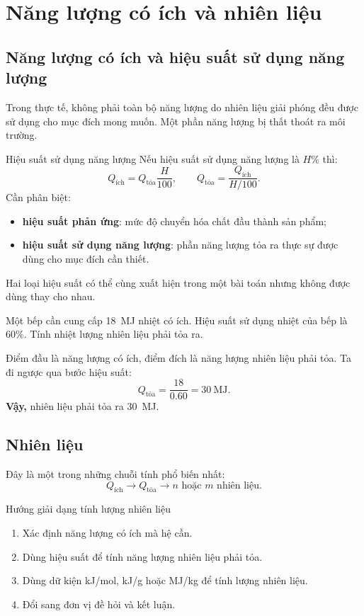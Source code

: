 \section{Năng lượng có ích và nhiên liệu}

\subsection{Năng lượng có ích và hiệu suất sử dụng năng lượng}

Trong thực tế, không phải toàn bộ năng lượng do nhiên liệu giải phóng đều được sử dụng cho mục đích mong muốn. Một phần năng lượng bị thất thoát ra môi trường.

\begin{ghinho}{Hiệu suất sử dụng năng lượng}
Nếu hiệu suất sử dụng năng lượng là $H\%$ thì:
\[
Q_{\text{ích}}=Q_{\text{tỏa}}\frac{H}{100},
\qquad
Q_{\text{tỏa}}=\frac{Q_{\text{ích}}}{H/100}.
\]
Cần phân biệt:
\begin{itemize}
\item \textbf{hiệu suất phản ứng}: mức độ chuyển hóa chất đầu thành sản phẩm;
\item \textbf{hiệu suất sử dụng năng lượng}: phần năng lượng tỏa ra thực sự được dùng cho mục đích cần thiết.
\end{itemize}
Hai loại hiệu suất có thể cùng xuất hiện trong một bài toán nhưng không được dùng thay cho nhau.
\end{ghinho}

\begin{vidu}
Một bếp cần cung cấp \SI{18}{\mega\joule} nhiệt có ích. Hiệu suất sử dụng nhiệt của bếp là $60\%$. Tính nhiệt lượng nhiên liệu phải tỏa ra.
\end{vidu}
\begin{loigiai}
Điểm đầu là năng lượng có ích, điểm đích là năng lượng nhiên liệu phải tỏa. Ta đi ngược qua bước hiệu suất:
\[
Q_{\text{tỏa}}=\frac{18}{0.60}=\SI{30}{\mega\joule}.
\]
\textbf{Vậy,} nhiên liệu phải tỏa ra \SI{30}{\mega\joule}.
\end{loigiai}

\subsection{Nhiên liệu}

Đây là một trong những chuỗi tính phổ biến nhất:
\[
\boxed{Q_{\text{ích}}}
\longrightarrow
\boxed{Q_{\text{tỏa}}}
\longrightarrow
\boxed{n\text{ hoặc }m\text{ nhiên liệu}}.
\]

\begin{ghinho}{Hướng giải dạng tính lượng nhiên liệu}
\begin{enumerate}
\item Xác định năng lượng có ích mà hệ cần.
\item Dùng hiệu suất để tính năng lượng nhiên liệu phải tỏa.
\item Dùng dữ kiện kJ/mol, kJ/g hoặc MJ/kg để tính lượng nhiên liệu.
\item Đổi sang đơn vị đề hỏi và kết luận.
\end{enumerate}
\end{ghinho}

